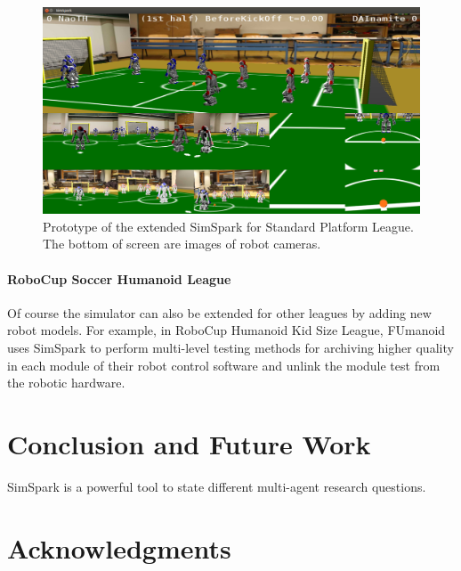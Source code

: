\documentclass{llncs}
\begin{document}
\begin{figure}
  \centering
  \includegraphics[width = 0.75\columnwidth]{simspark-spl}
  \caption{Prototype of the extended SimSpark for Standard Platform League.
    The bottom of screen are images of robot cameras.}
  \label{f:simspark-spl}
\end{figure}

\paragraph{RoboCup Soccer Humanoid League}
Of course the simulator can also be extended for other leagues by adding new robot models.
For example, in RoboCup Humanoid Kid Size League, FUmanoid\cite{Donat2012} uses
SimSpark to perform multi-level testing methods for archiving higher
quality in each module of their robot control software and unlink the
module test from the robotic hardware.


\section{Conclusion and Future Work}
\label{s:conclusion}
SimSpark is a powerful tool to state different multi-agent research questions.

\section*{Acknowledgments}



\end{document}
